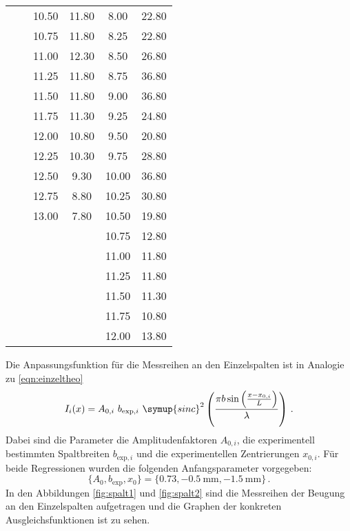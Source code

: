 \begin{longtable}{S[table-format=3.2] S[table-format=3.2] S[table-format=3.2] S[table-format=3.2] S[table-format=3.2] S[table-format=3.2]}
                     &     & 10.50 & 11.80 & 8.00 & 22.80\\
                     &     & 10.75 & 11.80 & 8.25 & 22.80\\
                     &     & 11.00 & 12.30 & 8.50 & 26.80\\
                     &     & 11.25 & 11.80 & 8.75 & 36.80\\
                     &     & 11.50 & 11.80 & 9.00 & 36.80\\
                     &     & 11.75 & 11.30 & 9.25 & 24.80\\
                     &     & 12.00 & 10.80 & 9.50 & 20.80\\
                     &     & 12.25 & 10.30 & 9.75 & 28.80\\
                     &     & 12.50 & 9.30 & 10.00 & 36.80\\
                     &     & 12.75 & 8.80 & 10.25 & 30.80\\
                     &     & 13.00 & 7.80 & 10.50 & 19.80\\
                     &     &    &  & 10.75 & 12.80\\
                     &     &    &  & 11.00 & 11.80\\
                     &     &    &  & 11.25 & 11.80\\
                     &     &    &  & 11.50 & 11.30\\
                     &     &    &  & 11.75 & 10.80\\
                     &     &    &  & 12.00 & 13.80\\
                \bottomrule
\end{longtable}

Die Anpassungsfunktion für die Messreihen an den Einzelspalten ist in Analogie zu
\eqref{eqn:einzeltheo}
\begin{equation}
  I_i (x) = A_{0,i} \,\, b_{\text{exp},i} \,\, \symup{sinc}^2\left(\frac{\pi b \sin\left(\frac{x-x_{0,i}}{L}\right)}{\lambda}\right) \,.
\end{equation}
Dabei sind die Parameter die Amplitudenfaktoren $A_{0,i}$, die experimentell bestimmten Spaltbreiten
$b_{\text{exp},i}$ und die experimentellen Zentrierungen $x_{0,i}$.
Für beide Regressionen wurden die folgenden Anfangsparameter vorgegeben:
\begin{equation}
  \{A_0, b_{\text{exp}}, x_0\} = \{0.73, \SI{-0.5}{\milli\meter}, \SI{-1.5}{\milli\meter}\}\,.
\end{equation}
In den Abbildungen \ref{fig:spalt1} und \ref{fig:spalt2} sind die Messreihen der Beugung an den Einzelspalten aufgetragen
und die Graphen der konkreten Ausgleichsfunktionen ist zu sehen.

